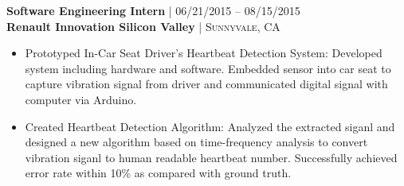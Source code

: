 {\raggedright\normalsize
\textbf{Software Engineering Intern} {\hfill\footnotesize\textsc{| 06/21/2015 -- 08/15/2015}}\\
\textbf{Renault Innovation Silicon Valley} {\hfill\footnotesize\textsc{| Sunnyvale, CA}}}

\begin{itemize}[leftmargin=*, topsep=2pt, partopsep=2.5pt]
\setlength\itemsep{1pt}

\item Prototyped In-Car Seat Driver's Heartbeat Detection System: Developed system including hardware and software. Embedded sensor into car seat to capture vibration signal from driver and communicated digital signal with computer via Arduino. 
\item Created Heartbeat Detection Algorithm: Analyzed the extracted siganl and designed a new algorithm based on time-frequency analysis to convert vibration siganl to human readable heartbeat number. Successfully achieved error rate within 10\% as compared with ground truth.
\end{itemize}
